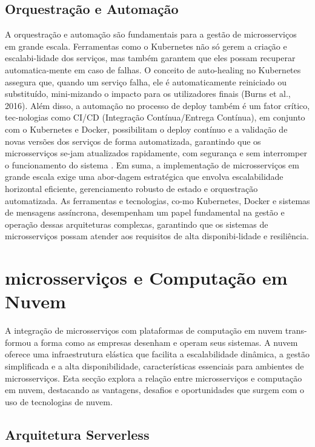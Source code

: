 \subsection{Orquestração e Automação}

A orquestração e automação são fundamentais para a gestão de microsserviços em grande escala. Ferramentas como o Kubernetes não só gerem a criação e escalabi-lidade dos serviços, mas também garantem que eles possam recuperar automatica-mente em caso de falhas. O conceito de auto-healing no Kubernetes assegura que, quando um serviço falha, ele é automaticamente reiniciado ou substituído, mini-mizando o impacto para os utilizadores finais (Burns et al., 2016).
Além disso, a automação no processo de deploy também é um fator crítico, tec-nologias como CI/CD (Integração Contínua/Entrega Contínua), em conjunto com o Kubernetes e Docker, possibilitam o deploy contínuo e a validação de novas versões dos serviços de forma automatizada, garantindo que os microsserviços se-jam atualizados rapidamente, com segurança e sem interromper o funcionamento do sistema \cite{Taherizadeh2020}.
Em suma, a implementação de microsserviços em grande escala exige uma abor-dagem estratégica que envolva escalabilidade horizontal eficiente, gerenciamento robusto de estado e orquestração automatizada. As ferramentas e tecnologias, co-mo Kubernetes, Docker e sistemas de mensagens assíncrona, desempenham um papel fundamental na gestão e operação dessas arquiteturas complexas, garantindo que os sistemas de microsserviços possam atender aos requisitos de alta disponibi-lidade e resiliência.

\section{microsserviços e Computação em Nuvem}

A integração de microsserviços com plataformas de computação em nuvem trans-formou a forma como as empresas desenham e operam seus sistemas. A nuvem oferece uma infraestrutura elástica que facilita a escalabilidade dinâmica, a gestão simplificada e a alta disponibilidade, características essenciais para ambientes de microsserviços. Esta secção explora a relação entre microsserviços e computação em nuvem, destacando as vantagens, desafios e oportunidades que surgem com o uso de tecnologias de nuvem.

\subsection{Arquitetura Serverless}

